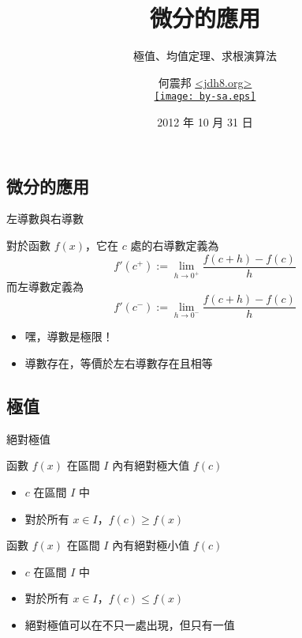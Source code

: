 \documentclass{beamer}
\begin{document}
\begin{CJK}{UTF8}{bsmi}
\title{微分的應用}
\subtitle{極值、均值定理、求根演算法}
\author[何震邦]{何震邦 \href{http://jdh8.org/}{\textless jdh8.org\textgreater}\\
    \href{http://creativecommons.org/licenses/by-sa/3.0/tw/deed.zh\textunderscore TW}{\texttt{[image: by-sa.eps]}}}
\date{2012 年 10 月 31 日}
\maketitle

\section{微分的應用}
\begin{frame}{左導數與右導數}
  \begin{definition}
    對於函數 $f(x)$，它在 $c$ 處的右導數定義為
    \[f'(c^+) := \lim_{h\to0^+} \frac{f(c+h) - f(c)}{h}\]
    而左導數定義為
    \[f'(c^-) := \lim_{h\to0^-} \frac{f(c+h) - f(c)}{h}\]
  \end{definition}
  \begin{itemize}
    \item 嘿，導數是極限！
    \item 導數存在，等價於左右導數存在且相等
  \end{itemize}
\end{frame}

\subsection{極值}
\begin{frame}{絕對極值}
  \begin{definition}
    函數 $f(x)$ 在區間 $I$ 內有絕對極大值 $f(c)$
    \begin{itemize}
      \item $c$ 在區間 $I$ 中
      \item 對於所有 $x \in I$，$f(c) \ge f(x)$
    \end{itemize}
  \end{definition}
  \begin{definition}
    函數 $f(x)$ 在區間 $I$ 內有絕對極小值 $f(c)$
    \begin{itemize}
      \item $c$ 在區間 $I$ 中
      \item 對於所有 $x \in I$，$f(c) \le f(x)$
    \end{itemize}
  \end{definition}
  \begin{itemize}
    \item 絕對極值可以在不只一處出現，但只有一值
  \end{itemize}
\end{frame}


\end{CJK}
\end{document}
